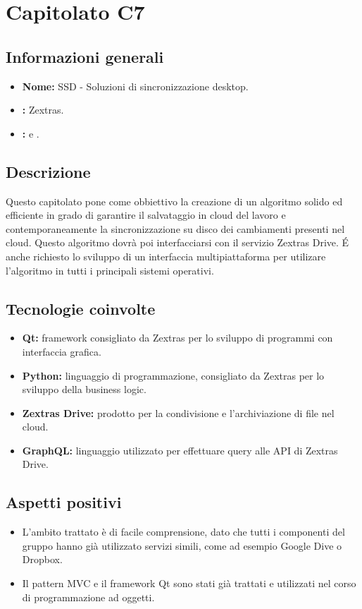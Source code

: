 \section{Capitolato C7}

\subsection{Informazioni generali}
\begin{itemize}
\item \textbf{Nome:} SSD - Soluzioni di sincronizzazione desktop.
\item \textbf{\commitProg:} Zextras.
\item \textbf{\proponProg:} \VT{} e \CR.
\end{itemize}

\subsection{Descrizione}
Questo capitolato pone come obbiettivo la creazione di un algoritmo solido ed efficiente in grado di garantire il salvataggio in cloud del lavoro e contemporaneamente la sincronizzazione su disco dei cambiamenti presenti nel cloud. Questo algoritmo dovrà poi interfacciarsi con il servizio Zextras Drive. É anche richiesto lo sviluppo di un interfaccia multipiattaforma per utilizare l'algoritmo in tutti i principali sistemi operativi.

\subsection{Tecnologie coinvolte}
\begin{itemize}
\item \textbf{Qt:} framework consigliato da Zextras per lo sviluppo di programmi con interfaccia grafica.
\item \textbf{Python:} linguaggio di programmazione, consigliato da Zextras per lo sviluppo della business logic.
\item \textbf{Zextras Drive:} prodotto per la condivisione e l'archiviazione di file nel cloud.
\item \textbf{GraphQL:} linguaggio utilizzato per effettuare query alle API di Zextras Drive.
\end{itemize}

\subsection{Aspetti positivi}
\begin{itemize}
\item L'ambito trattato è di facile comprensione, dato che tutti i componenti del gruppo hanno già utilizzato servizi simili, come ad esempio Google Dive o Dropbox.
\item Il pattern MVC e il framework Qt sono stati già trattati e utilizzati nel corso di programmazione ad oggetti.
\end{itemize}

